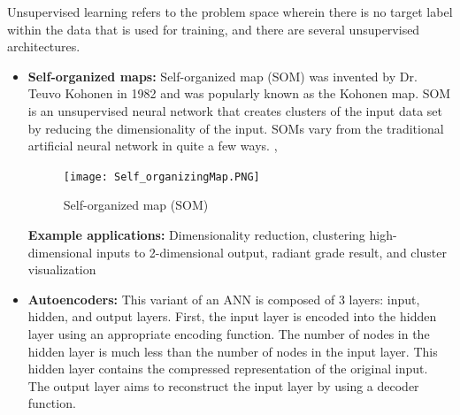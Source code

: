 Unsupervised learning refers to the problem space wherein there is no target label within the data that is used for training, and there are several unsupervised architectures.\cite{coates2011analysis}
\begin{itemize}
    \item \textbf{Self-organized maps: } Self-organized map (SOM) was invented by Dr. Teuvo Kohonen in 1982 and was popularly known as the Kohonen map. SOM is an unsupervised neural network that creates clusters of the input data set by reducing the dimensionality of the input. SOMs vary from the traditional artificial neural network in quite a few ways. \cite{alzubaidi2021review}, \cite{madhavan2017deep}

    \begin{figure}[H]
        \centering
        \texttt{[image: Self\_organizingMap.PNG]}
        \caption{Self-organized map (SOM)}
        \label{fig:Self-organized map (SOM)}
    \end{figure}
    \textbf{Example applications:} Dimensionality reduction, clustering high-dimensional inputs to 2-dimensional output, radiant grade result, and cluster visualization
    \item \textbf{Autoencoders: } This variant of an ANN is composed of 3 layers: input, hidden, and output layers.
    First, the input layer is encoded into the hidden layer using an appropriate encoding function. The number of nodes in the hidden layer is much less than the number of nodes in the input layer. This hidden layer contains the compressed representation of the original input. The output layer aims to reconstruct the input layer by using a decoder function.
    

\end{itemize}
